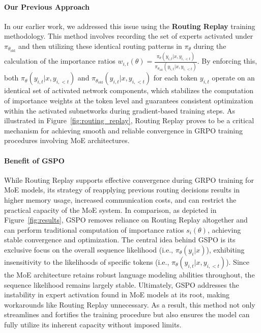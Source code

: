 \paragraph{Our Previous Approach} In our earlier work, we addressed this issue using the \textbf{Routing Replay} training methodology. This method involves recording the set of experts activated under $\pi_{\theta_\text{old}}$ and then utilizing these identical routing patterns in $\pi_{\theta}$ during the calculation of the importance ratios $w_{i,t}(\theta) = \frac{ \pi_{\theta} (y_{i,t} | x, y_{i,<t}) }{ \pi_{\theta_\text{old}} (y_{i,t} | x,y_{i,<t})}$. By enforcing this, both $\pi_{\theta} (y_{i,t} | x, y_{i,<t})$ and $\pi_{\theta_\text{old}} (y_{i,t} | x,y_{i,<t})$ for each token $y_{i,t}$ operate on an identical set of activated network components, which stabilizes the computation of importance weights at the token level and guarantees consistent optimization within the activated subnetworks during gradient-based training steps. As illustrated in Figure~\ref{fig:routing_replay}, Routing Replay proves to be a critical mechanism for achieving smooth and reliable convergence in GRPO training procedures involving MoE architectures.

\paragraph{Benefit of GSPO} While Routing Replay supports effective convergence during GRPO training for MoE models, its strategy of reapplying previous routing decisions results in higher memory usage, increased communication costs, and can restrict the practical capacity of the MoE system. In comparison, as depicted in Figure~\ref{fig:results}, GSPO removes reliance on Routing Replay altogether and can perform traditional computation of importance ratios $s_i(\theta)$, achieving stable convergence and optimization. The central idea behind GSPO is its exclusive focus on the overall sequence likelihood (i.e., $\pi_{\theta} (y_i | x)$), exhibiting insensitivity to the likelihoods of specific tokens (i.e., $\pi_{\theta} (y_{i,t} | x, y_{i,<t})$). Since the MoE architecture retains robust language modeling abilities throughout, the sequence likelihood remains largely stable. Ultimately, GSPO addresses the instability in expert activation found in MoE models at its root, making workarounds like Routing Replay unnecessary. As a result, this method not only streamlines and fortifies the training procedure but also ensures the model can fully utilize its inherent capacity without imposed limits.

